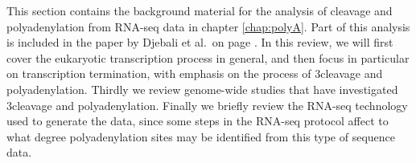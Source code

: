 %
This section contains the background material for the analysis of cleavage and
polyadenylation from RNA-seq data in chapter \ref{chap:polyA}. Part of this
analysis is included in the paper by Djebali et al.\ on page
\pageref{landscape}. In this review, we will first cover the eukaryotic
transcription process in general, and then focus in particular on transcription
termination, with emphasis on the process of 3\ppp cleavage and
polyadenylation. Thirdly we review genome-wide studies that have investigated
3\ppp cleavage and polyadenylation. Finally we briefly review the RNA-seq
technology used to generate the data, since some steps in the RNA-seq protocol
affect to what degree polyadenylation sites may be identified from this type of
sequence data.
